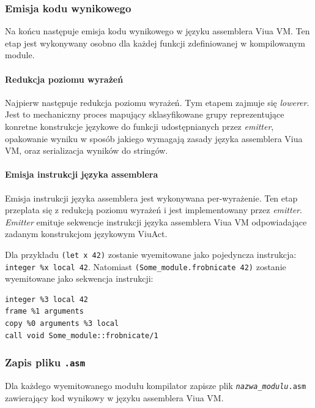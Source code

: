 \documentclass[11pt,oneside,a4paper,titlepage,onecolumn]{article}
\begin{document}
\subsubsection{Emisja kodu wynikowego}
\label{opis_etapow_kompilacji_emisja_kodu_wynikowego}

Na końcu następuje emisja kodu wynikowego w języku assemblera Viua VM. Ten etap jest wykonywany osobno dla
każdej funkcji zdefiniowanej w kompilowanym module.

\paragraph{Redukcja poziomu wyrażeń}

Najpierw następuje redukcja poziomu wyrażeń. Tym etapem zajmuje się \emph{lowerer}. Jest to mechaniczny proces
mapujący sklasyfikowane grupy reprezentujące konretne konstrukcje językowe do funkcji udostępnianych przez
\emph{emitter}, opakowanie wyniku w sposób jakiego wymagają zasady języka assemblera Viua VM, oraz
serializacja wyników do stringów.

\paragraph{Emisja instrukcji języka assemblera}

Emisja instrukcji języka assemblera jest wykonywana per-wyrażenie. Ten etap przeplata się z redukcją poziomu
wyrażeń i jest implementowany przez \emph{emitter}. \emph{Emitter} emituje sekwencje instrukcji języka
assemblera Viua VM odpowiadające zadanym konstrukcjom językowym ViuAct.

Dla przykładu \texttt{(let x 42)} zostanie wyemitowane jako pojedyncza instrukcja: \texttt{integer \%x local
42}.  Natomiast \texttt{(Some\_module.frobnicate 42)} zostanie wyemitowane jako sekwencja instrukcji:

\begin{lstlisting}
integer %3 local 42
frame %1 arguments
copy %0 arguments %3 local
call void Some_module::frobnicate/1
\end{lstlisting}

\subsubsection{Zapis pliku \texttt{.asm}}

Dla każdego wyemitowanego modułu kompilator zapisze plik \texttt{\emph{nazwa\_modulu}.asm} zawierający kod
wynikowy w języku assemblera Viua VM.
\end{document}
